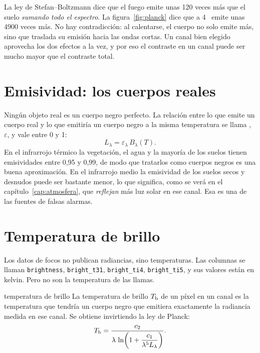 \begin{intuicion}
La ley de Stefan--Boltzmann dice que el fuego emite unas 120 veces más que el suelo
\emph{sumando todo el espectro}. La figura~\ref{fig:planck} dice que a 4~\um{} emite unas 4900
veces más. No hay contradicción: al calentarse, el cuerpo no solo emite más, sino que traslada
su emisión hacia las ondas cortas. Un canal bien elegido aprovecha los dos efectos a la vez, y
por eso el contraste en un canal puede ser mucho mayor que el contraste total.
\end{intuicion}

\section{Emisividad: los cuerpos reales}

Ningún objeto real es un cuerpo negro perfecto. La relación entre lo que emite un cuerpo real y
lo que emitiría un cuerpo negro a la misma temperatura se llama ,
$\varepsilon$, y vale entre 0 y 1:
\begin{equation}
  L_\lambda = \varepsilon_\lambda \, B_\lambda(T).
\end{equation}
En el infrarrojo térmico la vegetación, el agua y la mayoría de los suelos tienen emisividades
entre 0,95 y 0,99, de modo que tratarlos como cuerpos negros es una buena aproximación. En el
infrarrojo medio la emisividad de los suelos secos y desnudos puede ser bastante menor, lo que
significa, como se verá en el capítulo~\ref{cap:atmosfera}, que \emph{reflejan} más luz solar
en ese canal. Esa es una de las fuentes de falsas alarmas.

\section{Temperatura de brillo}\label{sec:tb}

Los datos de focos no publican radiancias, sino temperaturas. Las columnas se llaman
\texttt{brightness}, \texttt{bright\_t31}, \texttt{bright\_ti4}, \texttt{bright\_ti5}, y sus
valores están en kelvin. Pero no son la temperatura de las llamas.

\begin{definicion}{temperatura de brillo}
La temperatura de brillo $T_{\mathrm{b}}$ de un píxel en un canal es la temperatura que tendría un cuerpo
negro que emitiera exactamente la radiancia medida en ese canal. Se obtiene invirtiendo la ley
de Planck:
\begin{equation}\label{eq:tb}
  T_{\mathrm{b}} = \frac{c_2}{\lambda\,\ln\!\left(1 + \dfrac{c_1}{\lambda^5 L_\lambda}\right)} .
\end{equation}
\end{definicion}

